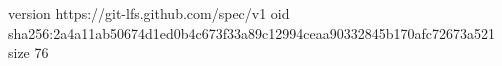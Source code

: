 version https://git-lfs.github.com/spec/v1
oid sha256:2a4a11ab50674d1ed0b4c673f33a89c12994ceaa90332845b170afc72673a521
size 76
